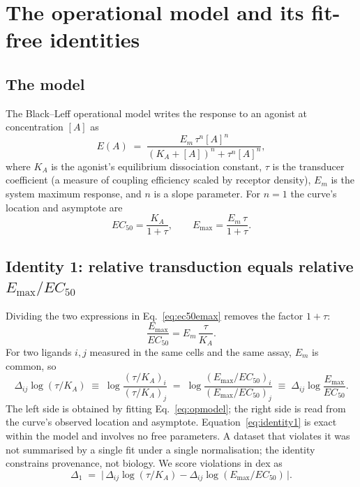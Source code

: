 ﻿\documentclass[11pt,a4paper]{article}
\newcommand{\logR}{\ensuremath{\log(\tau/K_{\!A})}}
\newcommand{\Emax}{\ensuremath{E_{\max}}}
\newcommand{\ECfifty}{\ensuremath{EC_{50}}}
\begin{document}
\section{The operational model and its fit-free identities}
\label{sec:identities}

\subsection{The model}

The Black--Leff operational model \cite{BlackLeff1983} writes the response to an agonist at concentration $[A]$ as
\begin{equation}
E(A) \;=\; \frac{E_m\,\tau^{n}[A]^{n}}{(K_{\!A}+[A])^{n}+\tau^{n}[A]^{n}},
\label{eq:opmodel}
\end{equation}
where $K_{\!A}$ is the agonist's equilibrium dissociation constant, $\tau$ is the transducer coefficient (a measure of coupling efficiency scaled by receptor density), $E_m$ is the system maximum response, and $n$ is a slope parameter. For $n=1$ the curve's location and asymptote are
\begin{equation}
\ECfifty=\frac{K_{\!A}}{1+\tau},
\qquad
\Emax=\frac{E_m\,\tau}{1+\tau}.
\label{eq:ec50emax}
\end{equation}

\subsection{Identity 1: relative transduction equals relative \texorpdfstring{$\Emax/\ECfifty$}{Emax/EC50}}

Dividing the two expressions in Eq.~\eqref{eq:ec50emax} removes the factor $1+\tau$:
\begin{equation}
\frac{\Emax}{\ECfifty}=E_m\,\frac{\tau}{K_{\!A}}.
\label{eq:ratio}
\end{equation}
For two ligands $i,j$ measured in the same cells and the same assay, $E_m$ is common, so
\begin{equation}
\Delta_{ij}\logR \;\equiv\; \log\frac{(\tau/K_{\!A})_i}{(\tau/K_{\!A})_j}
\;=\;
\log\frac{(\Emax/\ECfifty)_i}{(\Emax/\ECfifty)_j}
\;\equiv\; \Delta_{ij}\log\!\frac{\Emax}{\ECfifty}.
\label{eq:identity1}
\end{equation}
The left side is obtained by fitting Eq.~\eqref{eq:opmodel}; the right side is read from the curve's observed location and asymptote. Equation~\eqref{eq:identity1} is exact within the model and involves no free parameters. A dataset that violates it was not summarised by a single fit under a single normalisation; the identity constrains provenance, not biology. We score violations in dex as
\begin{equation}
\Delta_1 \;=\; \big|\,\Delta_{ij}\logR - \Delta_{ij}\log(\Emax/\ECfifty)\,\big|.
\label{eq:dev1}
\end{equation}
\end{document}
